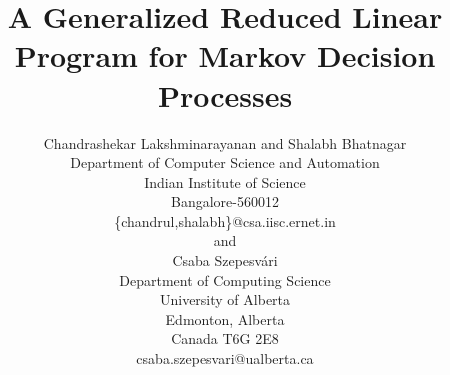 \documentclass[12pt,draftcls,onecolumn]{IEEEtran}
\title{A Generalized Reduced Linear Program for Markov Decision Processes}
\author{Chandrashekar Lakshminarayanan and Shalabh Bhatnagar\\Department of Computer Science and Automation\\ Indian Institute of Science\\ Bangalore-560012\\\{chandrul,shalabh\}@csa.iisc.ernet.in\\ and \\
Csaba Szepesv\'{a}ri\\Department of Computing Science\\University of Alberta\\Edmonton, Alberta\\Canada T6G 2E8\\  csaba.szepesvari@ualberta.ca }
\begin{document}
\maketitle














%
%


\newpage
\onecolumn
%
\end{document}
